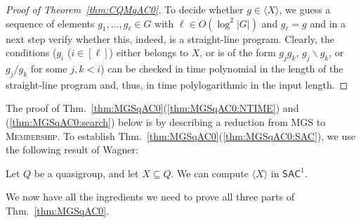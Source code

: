 \documentclass{article}
\newcommand{\algprobm}[1]{\textsc{#1}\xspace}
\newcommand{\Thm}[1]{Thm.~\ref{#1}\xspace}
\newcommand*{\ComplexityClass}[1]{\ensuremath{\mathsf{#1}}\xspace}
\newcommand{\SAC}{\ComplexityClass{SAC}}
\begin{document}
\begin{proof}[Proof of Theorem~\ref{thm:CQMqAC0}]
    To decide whether $g \in \langle X \rangle$, we guess a sequence of elements $g_1, \dots, g_\ell \in G$ with $\ell \in O(\log^2 |G|)$ and $g_\ell = g$ and in a next step verify whether this, indeed, is a straight-line program. Clearly, the conditions ($g_{i}$ ($i \in [\ell]$) either belongs to $X$, or is of the form $g_{j}g_{k}$, $g_{j}\backslash g_{k}$, or $g_{j}/ g_{k}$ for some $j, k < i$) can be checked in time polynomial in the length of the straight-line program and, thus, in time polylogarithmic in the input length.
\end{proof}

The proof of \Thm{thm:MGSqAC0}(\ref{thm:MGSqAC0:NTIME}) and (\ref{thm:MGSqAC0:search}) below is by describing a reduction from \algprobm{MGS} to \algprobm{Membership}.
To establish \Thm{thm:MGSqAC0}(\ref{thm:MGSqAC0:SAC}), we use the following result of Wagner:

\begin{lemma} \label{lem:QuasigroupGeneration}
Let $Q$ be a quasigroup, and let $X \subseteq Q$. We can compute $\langle X \rangle$ in $\SAC^{1}$.
\end{lemma}

We now have all the ingredients we need to prove all three parts of \Thm{thm:MGSqAC0}.
\end{document}
